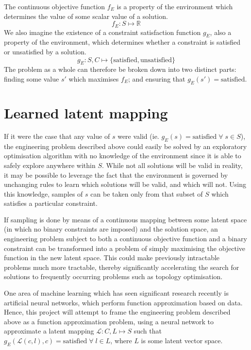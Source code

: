 \documentclass[../../main.tex]{subfiles}
\begin{document}
The continuous objective function $f_E$ is a property of the environment which determines the value of some scalar value of a solution.
$$f_E : S \mapsto \mathbb{R}$$
We also imagine the existence of a constraint satisfaction function $g_E$, also a property of the environment, which determines whether a constraint is satisfied or unsatisfied by a solution.
$$g_E : S, C \mapsto \{\text{satisfied}, \text{unsatisfied}\}$$
The problem as a whole can therefore be broken down into two distinct parts: finding some value $s'$ which maximises $f_E$; and ensuring that $g_E(s') = \text{satisfied}$.

\section{Learned latent mapping}

If it were the case that any value of $s$ were valid (ie. $g_E(s) = \text{satisfied} \; \forall \; s \in S$), the engineering problem described above could easily be solved by an exploratory optimisation algorithm with no knowledge of the environment since it is able to safely explore anywhere within $S$.
While not all solutions will be valid in reality, it may be possible to leverage the fact that the environment is governed by unchanging rules to learn which solutions will be valid, and which will not.
Using this knowledge, samples of $s$ can be taken only from that subset of $S$ which satisfies a particular constraint.

If sampling is done by means of a continuous mapping between some latent space (in which no binary constraints are imposed) and the solution space, an engineering problem subject to both a continuous objective function and a binary constraint can be transformed into a problem of simply maximising the objective function in the new latent space.
This could make previously intractable problems much more tractable, thereby significantly accelerating the search for solutions to frequently occurring problems such as topology optimisation.

One area of machine learning which has seen significant research recently is artificial neural networks, which perform function approximation based on data.
Hence, this project will attempt to frame the engineering problem described above as a function approximation problem, using a neural network to approximate a latent mapping $\mathcal{L} : C, L \mapsto S$ such that $g_E(\mathcal{L}(c, l), c) = \text{satisfied} \; \forall \; l \in L$, where $L$ is some latent vector space.
\end{document}
